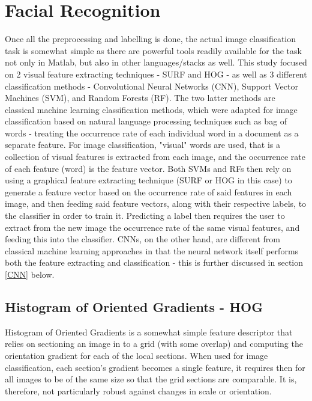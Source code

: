 \documentclass[11pt]{article}
\begin{document}

\section{Facial Recognition}
    Once all the preprocessing and labelling is done, the actual image classification task is somewhat simple as there are powerful tools readily available for the task not only in Matlab, but also in other languages/stacks as well. This study focused on 2 visual feature extracting techniques - SURF and HOG - as well as 3 different classification methods - Convolutional Neural Networks (CNN), Support Vector Machines (SVM), and Random Forests (RF). The two latter methods are classical machine learning classification methods, which were adapted for image classification based on natural language processing techniques such as bag of words - treating the occurrence rate of each individual word in a document as a separate feature. For image classification, "visual" words are used, that is a collection of visual features is extracted from each image, and the occurrence rate of each feature (word) is the feature vector. Both SVMs and RFs then rely on using a graphical feature extracting technique (SURF or HOG in this case) to generate a feature vector based on the occurrence rate of said features in each image, and then feeding said feature vectors, along with their respective labels, to the classifier in order to train it. Predicting a label then requires the user to extract from the new image the occurrence rate of the same visual features, and feeding this into the classifier. CNNs, on the other hand, are different from classical machine learning approaches in that the neural network itself performs both the feature extracting and classification - this is further discussed in section \ref{CNN} below.

    \subsection{Histogram of Oriented Gradients - HOG}
        Histogram of Oriented Gradients is a somewhat simple feature descriptor that relies on sectioning an image in to a grid (with some overlap) and computing the orientation gradient for each of the local sections. When used for image classification, each section's gradient becomes a single feature, it requires then for all images to be of the same size so that the grid sections are comparable. It is, therefore, not particularly robust against changes in scale or orientation.
\end{document}
